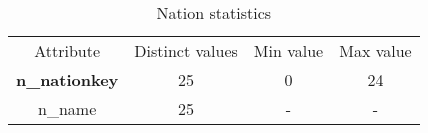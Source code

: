 \begin{table}[H]
\centering
\begin{tabular}{c|c|c|c} 
\rowcolor{blue!50} Attribute & Distinct values & Min value & Max value \\
\rowcolor{gray!10} \textbf{n\_nationkey} & 25 & 0 & 24 \\
\rowcolor{white} n\_name & 25 & - & - \\
\end{tabular}\\[0.5cm]
    \caption{Nation statistics}
    \label{tab:nation_stats}
\end{table}

